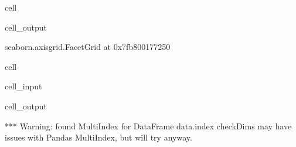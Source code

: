 \documentclass[letterpaper,table,10pt,english]{jupyterBook}
\begin{document}
\begin{sphinxuseclass}{cell}
\begin{sphinxVerbatimOutput}
\begin{sphinxuseclass}{cell_output}
\begin{sphinxVerbatim}[commandchars=\\\{\}]
\PYGZlt{}seaborn.axisgrid.FacetGrid at 0x7fb800177250\PYGZgt{}
\end{sphinxVerbatim}

\noindent{}

\end{sphinxuseclass}\end{sphinxVerbatimOutput}

\end{sphinxuseclass}
\begin{sphinxuseclass}{cell}\begin{sphinxVerbatimInput}

\begin{sphinxuseclass}{cell_input}
\begin{sphinxVerbatim}[commandchars=\\\{\}]
   
       
                      
\end{sphinxVerbatim}

\end{sphinxuseclass}\end{sphinxVerbatimInput}
\begin{sphinxVerbatimOutput}

\begin{sphinxuseclass}{cell_output}
\begin{sphinxVerbatim}[commandchars=\\\{\}]
*** Warning: found MultiIndex for DataFrame data.index \PYGZhy{} checkDims may have issues with Pandas MultiIndex, but will try anyway.
\end{sphinxVerbatim}


\end{sphinxuseclass}
\end{sphinxVerbatimOutput}
\end{sphinxuseclass}
\end{document}
